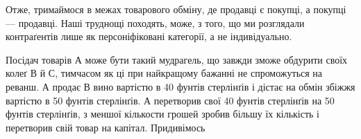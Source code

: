 Отже, тримаймося в межах товарового обміну, де продавці
є покупці, а покупці — продавці. Наші труднощі походять,
може, з того, що ми розглядали контраґентів лише як персоніфіковані
категорії, а не індивідуально.

Посідач товарів $А$ може бути такий мудрагель, що завжди
зможе обдурити своїх колеґ $В$ й $С$, тимчасом як ці при найкращому
бажанні не спроможуться на реванш. $А$ продає $В$ вино вартістю
в 40 фунтів стерлінґів і дістає на обмін збіжжя вартістю в
50 фунтів стерлінґів. $А$ перетворив свої 40 фунтів стерлінґів
на 50 фунтів стерлінґів, з меншої кількости грошей зробив більшу
їх кількість і перетворив свій товар на капітал. Придивімось
\parbreak{}  %
